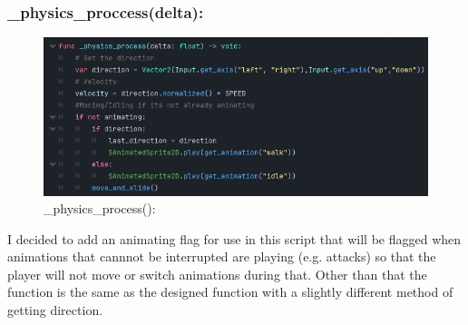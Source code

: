 \documentclass{article}
\begin{document}
        \subsubsection{\_physics\_proccess(delta):}
        \begin{figure}[H]
                \centering
                \includegraphics[width = 0.8\columnwidth]{images/development/Player_physics_process().PNG}
                \caption{\_physics\_process():}
        \end{figure}
        \noindent I decided to add an animating flag for use in this script that will be flagged when animations that cannnot be interrupted are playing (e.g. attacks) so that the player will not move or switch animations during that. Other than that the function is the same as the designed function with a slightly different method of getting direction.\\
\end{document}
